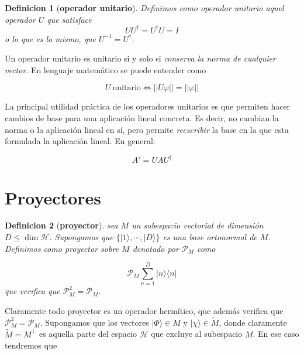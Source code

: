 \documentclass[12pt,a4paper]{book}
\numberwithin{equation}{chapter}
\numberwithin{figure}{chapter}
\newtheorem{definition}{Definicion}[section]
\begin{document}
\begin{definition}[\textbf{operador unitario}] 
Definimos como operador unitario aquel operador $U$ que satisface
\begin{equation}
U U^\dagger = U^\dagger U = I
\end{equation}
o lo que es lo mismo, que $U^{-1} = U^\dagger$.
\end{definition}

Un operador unitario es unitario si y solo si \textit{conserva la norma de cualquier vector}. En lenguaje matemático se puede entender como

\begin{equation}
U \ \mathrm{unitario}  \Longleftrightarrow || U \varphi || = || \varphi  ||
\end{equation}

La principal utilidad práctica de los operadores unitarios es que permiten hacer cambios de base para una aplicación lineal concreta. Es decir, no cambian la norma o la aplicación lineal en sí, pero permite \textit{reescribir} la base en la que esta formulada la aplicación lineal. En general:

\begin{equation}
A ' = U A U^\dagger
\end{equation}

\section{Proyectores}

\begin{definition}[\textbf{proyector}]
sea $M$ un subespacio vectorial de dimensión $D \leq \dim \mathcal{H}$. Supongamos que $\{ | 1 \rangle, \cdots, | D \rangle \}$ es una base ortonormal de $M$. Definimos como proyector sobre $M$ denotado por $\mathcal{P}_M$ como 

\begin{equation}
\mathcal{P}_M \sum_{n=1}^D | n \rangle \langle n |
\end{equation}
que verifica que $\mathcal{P}^2_M = \mathcal{P}_M$. 
\end{definition}

Claramente todo proyector es un operador hermítico, que además verifica que $\mathcal{P}_M^2 = \mathcal{P}_M$. Supongamos que los vectores $|\Phi \rangle \in M$ y $| \chi \rangle \in \tilde{M}$, donde claramente $\tilde{M} = M^\perp$ es aquella parte del espacio $\mathcal{H}$ que excluye al subespacio $M$. En ese caso tendremos que
\end{document}
